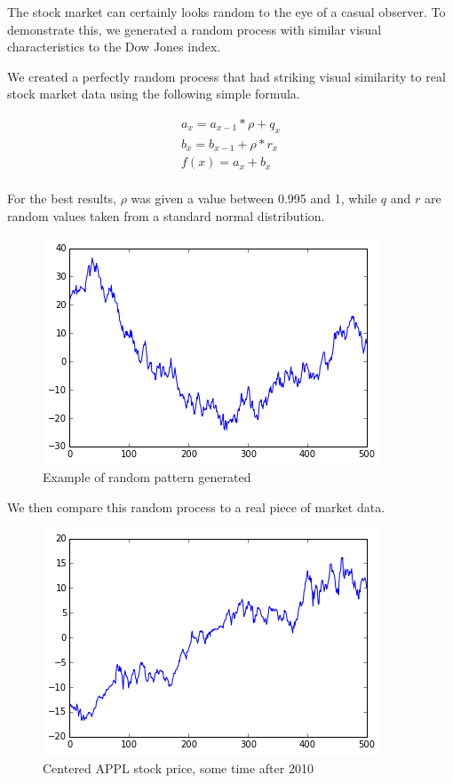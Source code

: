 \documentclass{report}
\begin{document}
The stock market can certainly looks random to the eye of a casual observer. To demonstrate this, we generated a random process with similar visual characteristics to the Dow Jones index.

We created a perfectly random process that had striking visual similarity to real stock market data using the following simple formula.

\begin{align*}
	a_{x} = a_{x-1} * \rho + q_{x}\\
	b_{x} = b_{x-1} + \rho * r_{x}\\
	f(x) = a_{x} + b_{x}\\
\end{align*}

For the best results, $\rho$ was given a value between 0.995 and 1, while $q$ and $r$ are random values taken from a standard normal distribution. 

\begin{figure}[H]
	\caption{Example of random pattern generated}
	\centerline{\includegraphics[width=\textwidth]{vis/random-process.png}}
	\label{fig:random-process}
\end{figure}

We then compare this random process to a real piece of market data.

\begin{figure}[H]
	\caption{Centered APPL stock price, some time after 2010}
	\centerline{\includegraphics[width=\textwidth]{vis/appl.png}}
	\label{fig:appl-process}
\end{figure}
\end{document}
